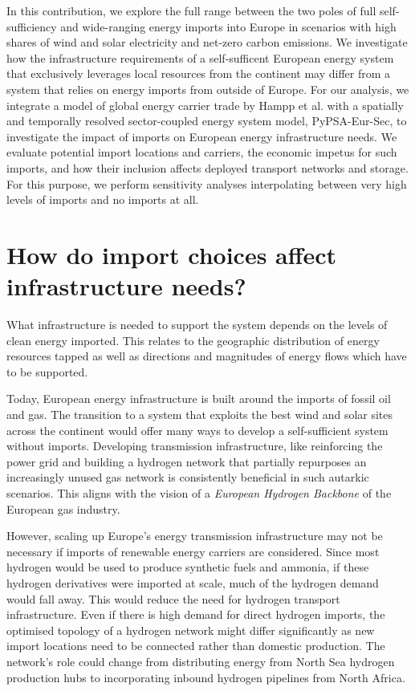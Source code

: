 \documentclass[10pt,5p,reversenotenum,lefttitle]{elsarticle}
\begin{document}
In this contribution, we explore the full range between the two poles of full
self-sufficiency and wide-ranging energy imports into Europe in scenarios with
high shares of wind and solar electricity and net-zero carbon emissions. We
investigate how the infrastructure requirements of a self-sufficent European
energy system that exclusively leverages local resources from the continent may
differ from a system that relies on energy imports from outside of Europe. For
our analysis, we integrate a model of global energy carrier trade by Hampp et
al.\cite{hamppImportOptions2021} with a spatially and temporally resolved
sector-coupled energy system model,
PyPSA-Eur-Sec,\cite{PyPSAEurSecSectorCoupled} to investigate the impact of
imports on European energy infrastructure needs. We evaluate potential import
locations and carriers, the economic impetus for such imports, and how their
inclusion affects deployed transport networks and storage. For this purpose, we
perform sensitivity analyses interpolating between very high levels of imports
and no imports at all.

\section*{How do import choices affect infrastructure needs?}

What infrastructure is needed to support the system depends on the levels of
clean energy imported. This relates to the geographic distribution of energy
resources tapped as well as directions and magnitudes of energy flows which have
to be supported.

Today, European energy infrastructure is built around the imports of fossil oil
and gas. The transition to a system that exploits the best wind and solar sites
across the continent would offer many ways to develop a self-sufficient system
without imports.\cite{pickeringDiversityOptions2022,brownSynergiesSector2018}
Developing transmission infrastructure, like reinforcing the power grid and
building a hydrogen network that partially repurposes an increasingly unused gas
network is consistently beneficial in such autarkic
scenarios.\cite{neumannBenefitsHydrogen2022a,wetzelGreenEnergy2022,victoriaSpeedTechnological2022}
This aligns with the vision of a \textit{European Hydrogen Backbone} of the
European gas industry.
\cite{gasforclimateEuropeanHydrogen2020,gasforclimateEuropeanHydrogen2022}

However, scaling up Europe's energy transmission infrastructure may not be
necessary if imports of renewable energy carriers are considered. Since most
hydrogen would be used to produce synthetic fuels and
ammonia,\cite{neumannBenefitsHydrogen2022a} if these hydrogen derivatives were
imported at scale, much of the hydrogen demand would fall away. This would
reduce the need for hydrogen transport infrastructure. Even if there is high
demand for direct hydrogen imports, the optimised topology of a hydrogen network
might differ significantly as new import locations need to be connected rather
than domestic production. The network's role could change from distributing
energy from North Sea hydrogen production hubs to incorporating inbound hydrogen
pipelines from North Africa.
\end{document}
